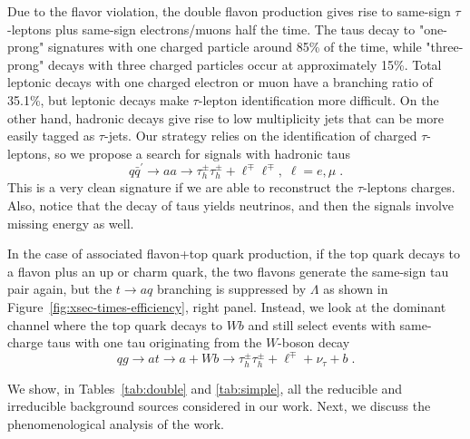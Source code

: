 \documentclass[prd,amsfonts,onecolumn,superscriptaddress,aps,nofootinbib,11pt]{revtex4-1}
\begin{document}
Due to the flavor violation, the double flavon production gives rise to same-sign $\tau$-leptons plus same-sign electrons/muons half the time. The taus decay to "one-prong" signatures with one charged particle around 85\% of the time, while "three-prong" decays with three charged particles occur at approximately 15\%. Total leptonic decays with one charged electron or muon have a branching ratio of 35.1\%, but leptonic decays make $\tau$-lepton identification more difficult. On the other hand, hadronic decays give rise to low multiplicity jets that can be more easily tagged as $\tau$-jets. Our strategy relies on the identification of charged $\tau$-leptons, so we propose a search for signals with hadronic taus 
\begin{equation}
q\bar{q}^\prime\to aa\to \tau_h^\pm\tau_h^\pm+\ell^\mp \ell^\mp,\; \ell=e,\mu\; .
\end{equation}
This is a very clean signature if we are able to reconstruct the $\tau$-leptons charges. Also, notice that the decay of taus yields neutrinos, and then the signals involve missing energy as well.

In the case of associated flavon+top quark production,  if the top quark decays to a flavon plus an up or charm quark, the two flavons generate the same-sign tau pair again, but the $t\to aq$ branching is suppressed by $\Lambda$ as shown in Figure~\ref{fig:xsec-times-efficiency}, right panel. Instead, we look at the dominant channel where the top quark decays to $Wb$ and still select events with same-charge taus with one tau originating from the $W$-boson decay
\begin{equation}
    qg \to a t \to a+W b\to \tau_h^{\pm} \tau_h^{\pm} + \ell^{\mp} + \nu_\tau + b \;.
\end{equation}

We show, in Tables~\eqref{tab:double} and \eqref{tab:simple}, all the reducible and irreducible background sources considered in our work. Next, we discuss the phenomenological analysis of the work.
\end{document}
